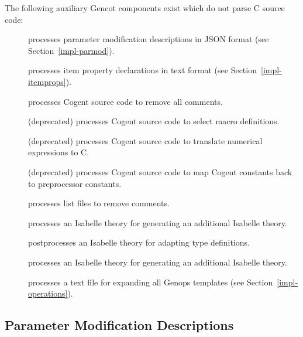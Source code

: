 The following auxiliary Gencot components exist which do not parse C source code:
\begin{description}
\item[] processes parameter modification descriptions in JSON format (see Section~\ref{impl-parmod}).
\item[] processes item property declarations in text format (see Section~\ref{impl-itemprops}).
\item[] processes Cogent source code to remove all comments.
\item[] (deprecated) processes Cogent source code to select macro definitions.
\item[] (deprecated) processes Cogent source code to translate numerical expressions to C.
\item[] (deprecated) processes Cogent source code to map Cogent constants back to preprocessor constants.
\item[] processes list files to remove comments.
\item[] processes an Isabelle theory for generating an additional Isabelle theory.
\item[] postprocesses an Isabelle theory for adapting type definitions.
\item[] processes an Isabelle theory for generating an additional Isabelle theory.
\item[] processes a text file for expanding all Genops templates (see Section~\ref{impl-operations}).
\end{description}

\subsection{Parameter Modification Descriptions}
\label{impl-ocomps-parmod}

